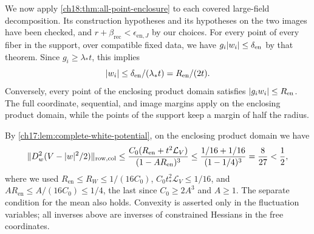 We now apply \cref{ch18:thm:all-point-enclosure} to each covered large-field decomposition. Its construction hypotheses and its hypotheses on the two images have been checked, and $r+\beta_{\mathrm{rec}}<\epsilon_{\mathrm{en},J}$ by our choices. For every point of every fiber in the support, over compatible fixed data, we have $g_i\lvert w_i\rvert\le\delta_{\mathrm{en}}$ by that theorem. Since $g_i\ge\lambda_*t$, this implies
\begin{equation}\label{ch20:eq:covered-point-enclosure}
 \lvert w_i\rvert\le\delta_{\mathrm{en}}/(\lambda_*t)=R_{\mathrm{en}}/(2t).
\end{equation}
Conversely, every point of the enclosing product domain satisfies $\lvert g_iw_i\rvert\le R_{\mathrm{en}}$. The full coordinate, sequential, and image margins apply on the enclosing product domain, while the points of the support keep a margin of half the radius.

By \cref{ch17:lem:complete-white-potential}, on the enclosing product domain we have
\begin{equation}\label{ch20:eq:complete-curvature}
 \lVert D_w^2(V-\lvert w\rvert^2/2)\rVert_{\mathrm{row,col}}\le\frac{C_0(R_{\mathrm{en}}+t^2\mathcal L_V)}{(1-AR_{\mathrm{en}})^3}\le\frac{1/16+1/16}{(1-1/4)^3}=\frac8{27}<\frac12,
\end{equation}
where we used $R_{\mathrm{en}}\le R_W\le1/(16C_0)$, $C_0t_*^2\mathcal L_V\le1/16$, and $AR_{\mathrm{en}}\le A/(16C_0)\le1/4$, the last since $C_0\ge2A^3$ and $A\ge1$. The separate condition for the mean also holds. Convexity is asserted only in the fluctuation variables; all inverses above are inverses of constrained Hessians in the free coordinates.

